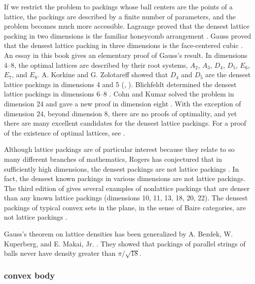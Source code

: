 If we restrict the problem
to packings whose ball centers are the points of a lattice, the
 packings are described by a finite number of parameters, and the
problem becomes much more accessible.  Lagrange proved that the
densest lattice packing in two dimensions is the familiar honeycomb
arrangement \cite{Lag73}. Gauss proved that the densest lattice
packing in three dimensions is the face-centered cubic \cite{Gau31}.
An essay in this book gives an elementary proof of Gauss's result.
In dimensions 4--8, the optimal lattices are described by their root
systems, $A_2$, $A_3$, $D_4$, $D_5$, $E_6$, $E_7$, and $E_8$. A.
Korkine and G. Zolotareff showed that $D_4$ and $D_5$ are the
densest lattice packings in dimensions 4 and 5 (\cite{KoZ73},
\cite{KoZ77}). Blichfeldt determined the densest lattice packings in
dimensions 6--8 \cite{Bli35}. 
Cohn and Kumar solved the problem in
dimension 24 and gave a new proof in dimension eight \cite{CoKu}.  
With the exception of dimension $24$,
beyond dimension $8$, there are no proofs of optimality, and yet
there are many excellent candidates for the densest lattice
packings.  For a proof of the existence of optimal lattices, see
\cite{Oes90}.


Although lattice packings are of particular interest because they
relate to so many different branches of mathematics, Rogers has
conjectured that in sufficiently high dimensions, the densest
packings are not lattice packings \cite{Rog64}.   In fact, the
densest known packings in various dimensions are not lattice
packings.  The third edition of \cite{CS} gives several examples
of nonlattice packings that are denser than any known lattice
packings (dimensions 10, 11, 13, 18, 20, 22). The densest packings
of typical convex sets in the plane, in the sense of Baire
categories, are not lattice packings \cite{Fej95}.

Gauss's theorem on lattice densities has been generalized by
A. Bezdek, W. Kuperberg, and E. Makai, Jr. \cite{BKM91}.
They showed that packings of parallel
strings of balls never have density greater than $\pi/\sqrt{18}$.

\subsubsection{convex body}

